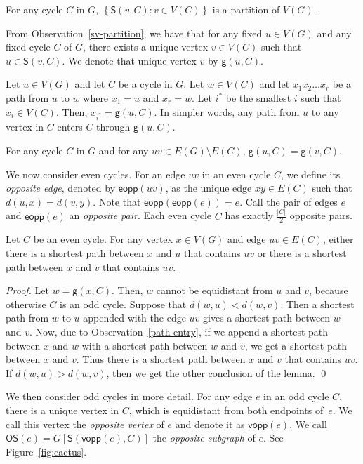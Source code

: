 \documentclass[letter,runningheads,envcountsame,envcountsect]{llncs}
\newcommand{\vopp}{\mathsf{vopp}}
\newcommand{\eeopp}{\mathsf{eopp}}
\newcommand{\os}{\mathsf{OS}}
\newcommand{\g}{\mathsf{g}}
\newcommand{\subg}{\mathsf{S}}
\begin{document}
\begin{observation}
	\label{sv-partition}
	For any cycle $C$ in $G$, $\left\{ 
	\subg(v,C):v\in V(C) \right\}$ is a partition of $V(G)$.
\end{observation}
%
From Observation~\ref{sv-partition}, we have that for any fixed $u\in V(G)$ and any fixed cycle $C$ of $G$, there exists a unique vertex $v\in V(C)$ such that $u\in \subg(v,C)$. We denote that unique vertex $v$ by $\g(u,C)$.

\begin{observation}
	\label{path-entry}
	Let $u\in V(G)$ and let $C$ be a cycle in $G$. 
	Let $w\in V(C)$ and let $x_1x_2\dots x_r$ be a path from $u$ to $w$ where $x_1=u$ and $x_r=w$.
	Let $i^*$ be the smallest $i$ such that $x_i\in V(C)$.
	Then, $x_{i^*}=\g(u,C)$.
	In simpler words, any path from $u$ to any vertex in $C$ enters $C$ through $\g(u,C)$.
\end{observation}

\begin{observation}
	\label{edge-entry}
	For any cycle $C$ in $G$ and for any $uv\in E(G)\setminus E(C)$, $\g(u,C)=\g(v,C)$.
\end{observation}
%
We now consider even cycles. For an edge $uv$ in an even cycle $C$, we define its \emph{opposite edge}, denoted by $\eeopp(uv)$, as the unique edge $xy\in E(C)$ such that $d(u,x)=d(v,y)$. Note that $\eeopp(\eeopp(e))=e$. Call the pair of edges $e$ and $\eeopp(e)$ an \emph{opposite pair}. Each even cycle $C$ has exactly $\frac{|C|}{2}$ opposite pairs. 

\begin{lemma}
	\label{even-edge}
	Let $C$ be an even cycle. 
	For any vertex $x\in V(G)$ and edge $uv\in E(C)$, either there is a shortest path between $x$ and $u$ that contains $uv$ or there is a shortest path between $x$ and $v$ that contains $uv$.
\end{lemma}
\begin{proof}
	Let $w=\g(x,C)$.
	Then, $w$ cannot be equidistant from $u$ and $v$, because otherwise $C$ is an odd cycle.
	Suppose that $d(w,u)<d(w,v)$.
	Then a shortest path from $w$ to $u$ appended with the edge $uv$ gives a shortest path between $w$ and $v$.
	Now, due to Observation~\ref{path-entry}, if we append a shortest path between $x$ and $w$ with a shortest path between $w$ and $v$, we get a shortest path between $x$ and $v$.
	Thus there is a shortest path between $x$ and $v$ that contains $uv$. If $d(w,u)>d(w,v)$, then we get the other conclusion of the lemma.
\qed\end{proof}
%
We then consider odd cycles in more detail. For any edge $e$ in an odd cycle $C$, there is a unique vertex in $C$, which is equidistant from both endpoints of~$e$. We call this vertex the \emph{opposite vertex} of $e$ and denote it as $\vopp(e)$. We call $\os(e) = G[\subg(\vopp(e),C)]$ the \emph{opposite subgraph} of $e$. See Figure~\ref{fig:cactus}.
\end{document}
